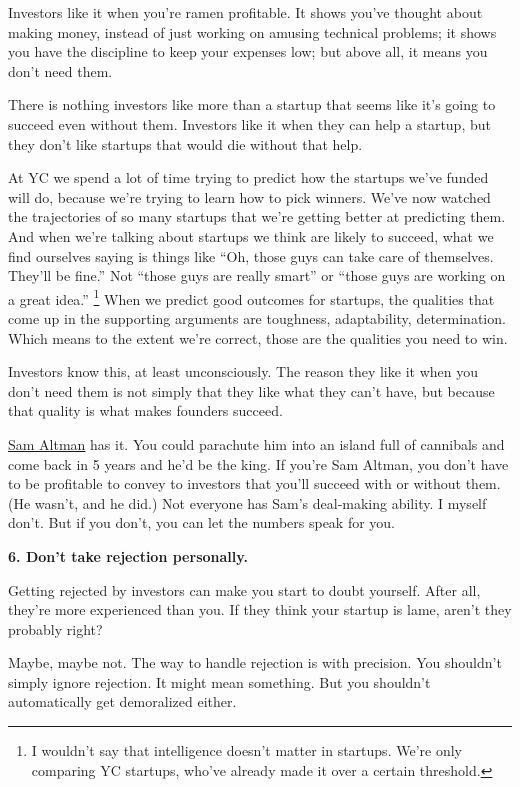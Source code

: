 \documentclass[12pt]{book}
\begin{document}
Investors like it when you're ramen profitable. It shows you've thought
about making money, instead of just working on amusing technical
problems; it shows you have the discipline to keep your expenses low;
but above all, it means you don't need them.

There is nothing investors like more than a startup that seems like it's
going to succeed even without them. Investors like it when they can help
a startup, but they don't like startups that would die without that
help.

At YC we spend a lot of time trying to predict how the startups we've
funded will do, because we're trying to learn how to pick winners. We've
now watched the trajectories of so many startups that we're getting
better at predicting them. And when we're talking about startups we
think are likely to succeed, what we find ourselves saying is things
like ``Oh, those guys can take care of themselves. They'll be fine.''
Not ``those guys are really smart'' or ``those guys are working on a
great idea.'' \footnote{I wouldn't say that intelligence doesn't matter in startups.
We're only comparing YC startups, who've already made it over a certain
threshold.} When we predict good outcomes for
startups, the qualities that come up in the supporting arguments are
toughness, adaptability, determination. Which means to the extent we're
correct, those are the qualities you need to win.

Investors know this, at least unconsciously. The reason they like it
when you don't need them is not simply that they like what they can't
have, but because that quality is what makes founders succeed.

\href{http://www.youtube.com/watch?v=KhhId_WG7RA}{Sam Altman} has it.
You could parachute him into an island full of cannibals and come back
in 5 years and he'd be the king. If you're Sam Altman, you don't have to
be profitable to convey to investors that you'll succeed with or without
them. (He wasn't, and he did.) Not everyone has Sam's deal-making
ability. I myself don't. But if you don't, you can let the numbers speak
for you.

\textbf{6. Don't take rejection personally.}

Getting rejected by investors can make you start to doubt yourself.
After all, they're more experienced than you. If they think your startup
is lame, aren't they probably right?

Maybe, maybe not. The way to handle rejection is with precision. You
shouldn't simply ignore rejection. It might mean something. But you
shouldn't automatically get demoralized either.
\end{document}
